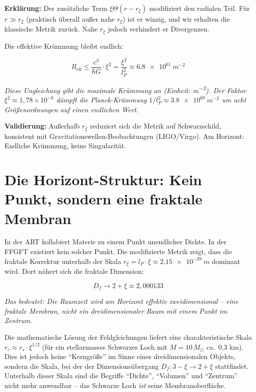 	\textbf{Erklärung:} Der zusätzliche Term \(\xi \Theta(r - r_\xi)\) modifiziert den radialen Teil. Für \(r \gg r_\xi\) (praktisch überall außer nahe $r_\xi$) ist er winzig, und wir erhalten die klassische Metrik zurück. Nahe $r_\xi$ jedoch verhindert er Divergenzen.
	
	Die effektive Krümmung bleibt endlich:
	
	\begin{equation}
		R_{\text{eff}} \leq \frac{c^3}{\hbar G} \cdot \xi^2 = \frac{\xi^2}{l_P^2} \approx \SI{6.8e61}{m^{-2}}
	\end{equation}
	
	\textit{Diese Ungleichung gibt die maximale Krümmung an (Einheit: \si{m^{-2}}). Der Faktor \(\xi^2 \approx 1{,}78 \times 10^{-8}\) dämpft die Planck-Krümmung \(1/l_P^2 \approx \SI{3.8e69}{m^{-2}}\) um acht Größenordnungen auf einen endlichen Wert.}
	
	\textbf{Validierung:} Außerhalb \(r_\xi\) reduziert sich die Metrik auf Schwarzschild, konsistent mit Gravitationswellen-Beobachtungen (LIGO/Virgo). Am Horizont: Endliche Krümmung, keine Singularität.
	
	\section{Die Horizont-Struktur: Kein Punkt, sondern eine fraktale Membran}
	
	In der ART kollabiert Materie zu einem Punkt unendlicher Dichte. In der FFGFT existiert kein solcher Punkt. Die modifizierte Metrik zeigt, dass die fraktale Korrektur unterhalb der Skala $r_\xi = l_P \cdot \xi \approx \SI{2.15e-39}{m}$ dominant wird. Dort nähert sich die fraktale Dimension:
	
	\begin{equation}
		D_f \to 2 + \xi \approx 2{,}000133
	\end{equation}
	
	\textit{Das bedeutet: Die Raumzeit wird am Horizont effektiv zweidimensional -- eine fraktale Membran, nicht ein dreidimensionaler Raum mit einem Punkt im Zentrum.}
	
	Die mathematische Lösung der Feldgleichungen liefert eine charakteristische Skala $r_c \approx r_s \cdot \xi^{1/2}$ (für ein stellarmasses Schwarzes Loch mit $M = 10\, M_\odot$ ca.\ 0{,}3 km). Dies ist jedoch keine \enquote{Kerngröße} im Sinne eines dreidimensionalen Objekts, sondern die Skala, bei der der Dimensionsübergang $D_f: 3 - \xi \to 2 + \xi$ stattfindet. Unterhalb dieser Skala sind die Begriffe \enquote{Dichte}, \enquote{Volumen} und \enquote{Zentrum} nicht mehr anwendbar -- das Schwarze Loch \textit{ist} seine Membranoberfläche.
	
